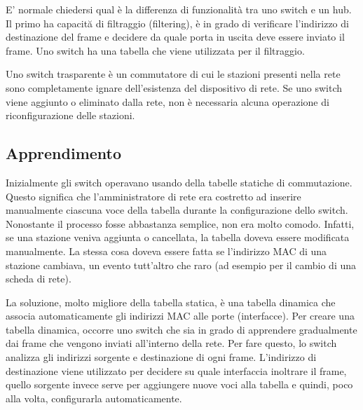 E' normale chiedersi qual è la differenza di funzionalità tra uno switch e un hub. Il primo ha capacită di filtraggio (filtering), è in grado di verificare l'indirizzo di destinazione del frame e decidere da quale porta in uscita deve essere inviato il frame. Uno switch ha una tabella che viene utilizzata per il filtraggio.

Uno switch trasparente è un commutatore di cui le stazioni presenti nella rete sono completamente ignare dell'esistenza del dispositivo di rete. Se uno switch viene aggiunto o eliminato dalla rete, non è necessaria alcuna operazione di riconfigurazione delle stazioni.

\subsection{Apprendimento}
Inizialmente gli switch operavano usando della tabelle statiche di commutazione. Questo significa che l'amministratore di rete era costretto ad inserire manualmente ciascuna voce della tabella durante la configurazione dello switch. Nonostante il processo fosse abbastanza semplice, non era molto comodo. Infatti, se una stazione veniva aggiunta o cancellata, la tabella doveva essere modificata manualmente. La stessa cosa doveva essere fatta se l'indirizzo MAC di una stazione cambiava, un evento tutt'altro che raro (ad esempio per il cambio di una scheda di rete).

La soluzione, molto migliore della tabella statica, è una tabella dinamica che associa automaticamente gli indirizzi MAC alle porte (interfacce). Per creare una tabella dinamica, occorre uno switch che sia in grado di apprendere gradualmente dai frame che vengono inviati all'interno della rete. Per fare questo, lo switch analizza gli indirizzi sorgente e destinazione di ogni frame. L'indirizzo di destinazione viene utilizzato per decidere su quale interfaccia inoltrare il frame, quello sorgente invece serve per aggiungere nuove voci alla tabella e quindi, poco alla volta, configurarla automaticamente.

